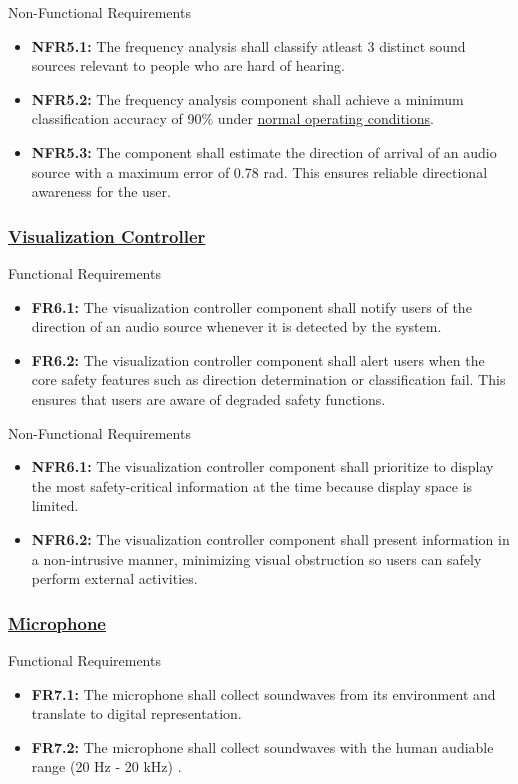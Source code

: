 \documentclass[12pt]{article}
\theoremstyle{definition}
\begin{document}
Non-Functional Requirements
\begin{itemize}
  \item \label{NFR5_1}\textbf{NFR5.1:} The frequency analysis shall classify
  atleast 3 distinct sound sources relevant to people who are hard of hearing.

  \item \label{NFR5_2}\textbf{NFR5.2:} The frequency analysis component shall
  achieve a minimum classification accuracy of 90\% under
  \hyperref[def:normal_operation_condition]{normal operating conditions}.

  \item \label{NFR5_3}\textbf{NFR5.3:} The component shall estimate the
  direction of arrival of an audio source with a maximum error of 0.78 rad.
  This ensures reliable directional awareness for the user.
\end{itemize}

\subsubsection{\hyperref[comp:viz_controller]{Visualization Controller}}
Functional Requirements
\begin{itemize}
  \item \label{FR6_1}\textbf{FR6.1:} The visualization controller component
  shall notify users of the direction of an audio source whenever it is
  detected by the system.

  \item \label{FR6_2}\textbf{FR6.2:} The visualization controller component
  shall alert users when the core safety features such as direction
  determination or classification fail. This ensures that users are aware of
  degraded safety functions.
\end{itemize}

Non-Functional Requirements
\begin{itemize}
  \item \label{NFR6_1}\textbf{NFR6.1:} The visualization controller component
  shall prioritize to display the most safety-critical information at the
  time because display space is limited.
  \item \label{NFR6_2}\textbf{NFR6.2:} The visualization controller component
  shall present information in a non-intrusive manner, minimizing visual
  obstruction so users can safely perform external activities.
\end{itemize}

\subsubsection{\hyperref[comp:microphone]{Microphone}}
Functional Requirements
\begin{itemize}
  \item \label{FR7_1}\textbf{FR7.1:} The microphone shall collect soundwaves
  from its environment and translate to digital representation.

  \item \label{FR7_2}\textbf{FR7.2:} The microphone shall collect soundwaves
  with the human audiable range (20 Hz - 20 kHz) \cite{Neuroscience2001}.
\end{itemize}
\end{document}
